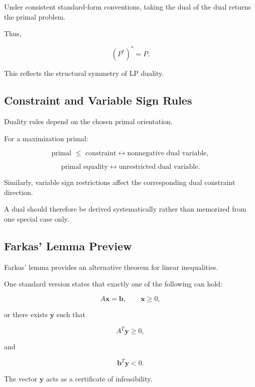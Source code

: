 Under consistent standard-form conventions, taking the dual of the dual
returns the primal problem.

Thus,

\[
\boxed{
(P^*)^*=P.
}
\]

This reflects the structural symmetry of LP duality.

\subsection{Constraint and Variable Sign Rules}
\label{subsec:lp-duality-sign-rules}

Duality rules depend on the chosen primal orientation.

For a maximization primal:

\[
\boxed{
\text{primal } \leq
\text{ constraint}
\leftrightarrow
\text{nonnegative dual variable},
}
\]

\[
\boxed{
\text{primal equality}
\leftrightarrow
\text{unrestricted dual variable}.
}
\]

Similarly, variable sign restrictions affect the corresponding dual
constraint direction.

A dual should therefore be derived systematically rather than memorized
from one special case only.

\subsection{Farkas' Lemma Preview}
\label{subsec:farkas-lemma}

Farkas' lemma provides an alternative theorem for linear inequalities.

One standard version states that exactly one of the following can hold:

\[
\boxed{
A\mathbf{x}
=
\mathbf{b},
\qquad
\mathbf{x}\geq0,
}
\]

or there exists \(\mathbf{y}\) such that

\[
\boxed{
A^T\mathbf{y}\geq0,
}
\]

and

\[
\boxed{
\mathbf{b}^T\mathbf{y}<0.
}
\]

The vector \(\mathbf{y}\) acts as a certificate of infeasibility.

